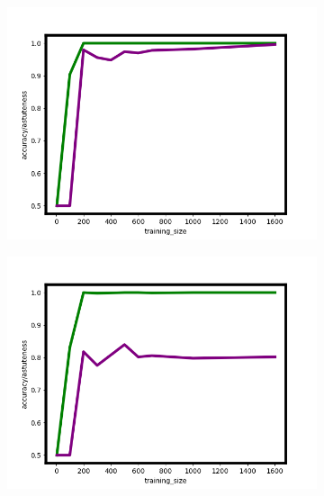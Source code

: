 \begin{figure}
\medskip
\begin{subfigure}{0.31\textwidth}
\includegraphics[width=\linewidth]{nn_noiseless_final}
\end{subfigure}\hspace*{\fill}
\begin{subfigure}{0.31\textwidth}
\includegraphics[width=\linewidth]{nn_noisy_final}
\end{subfigure}\hspace*{\fill}
\begin{subfigure}{0.31\textwidth}

\end{subfigure}
\end{figure}
